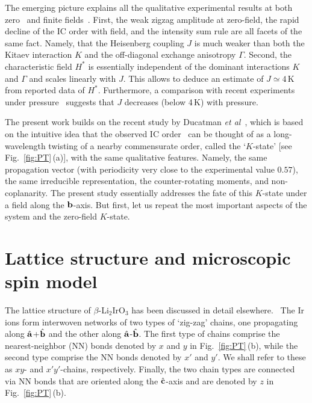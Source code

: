 \documentclass[prx,aps,groupedaddress,twocolumn]{revtex4-1}
\def\cdbl{\color{darkblue}}
\begin{document}
The emerging picture explains all the qualitative experimental  results at both zero~\cite{Biffin2014a} and finite fields~\cite{Ruiz2017}. First, the weak zigzag amplitude at zero-field, the rapid decline of the IC order with field, and the intensity sum rule are all facets of the same fact. Namely, that the Heisenberg coupling $J$ is much weaker than both the Kitaev interaction $K$ and the off-diagonal exchange anisotropy $\Gamma$. Second, the characteristic field $H^\ast$ is essentially independent of the dominant interactions $K$ and $\Gamma$ and scales linearly with $J$. This allows to deduce an estimate of $J\!\simeq\!4$\,K from reported data of $H^\ast$. Furthermore, a comparison with recent experiments under pressure~\cite{Tsirlin2018} suggests that $J$ decreases (below 4\,K) with pressure. 



The present work builds on the recent study by Ducatman {\it et al}~\cite{Sam2018}, which is based on the intuitive idea that the observed IC order~\cite{Biffin2014a} can be thought of as a long-wavelength twisting of a nearby commensurate order, called the `$K$-state' [see Fig.~\ref{fig:PT}\,(a)], with the same qualitative features. Namely, the same propagation vector (with periodicity very close to the experimental value $0.57$), the same irreducible representation, the counter-rotating moments, and non-coplanarity. The present study essentially addresses the fate of this $K$-state under a field along the ${\bf b}$-axis. But first, let us repeat the most important aspects of the system and the zero-field $K$-state.~\cite{Sam2018}


\vspace*{-0.5cm} 
\section{Lattice structure and microscopic spin model}
\vspace*{-0.3cm}
The lattice structure of $\beta$-Li$_2$IrO$_3$ has been discussed in detail elsewhere.~\cite{Biffin2014a,Lee2015,Lee2016,Ruiz2017,Sam2018}
%
The Ir ions form interwoven networks of two types of `zig-zag' chains, one propagating along $\hat{{\bf a}}$+$\hat{{\bf b}}$ and the other along $\hat{{\bf a}}$-$\hat{{\bf b}}$. 
%
The first type of chains comprise the nearest-neighbor (NN) bonds denoted by $x$ and $y$ in Fig.~\ref{fig:PT}\,(b), while the second type comprise the NN bonds denoted by $x'$ and $y'$. We shall refer to these as $xy$- and $x'y'$-chains, respectively.
%
Finally, the two chain types are connected via NN bonds that are oriented along the $\hat{{\bf c}}$-axis and are denoted by $z$ in Fig.~\ref{fig:PT}\,(b).
\end{document}
